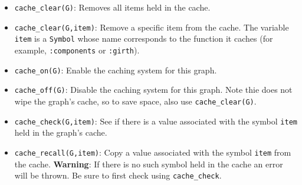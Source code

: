 \documentclass[oneside]{amsart}
\begin{document}
\begin{itemize}
\item \verb|cache_clear(G)|: Removes all items held in the cache.

\item \verb|cache_clear(G,item)|: Remove a specific item from the
  cache. The variable \verb|item| is a \verb|Symbol| whose name
  corresponds to the function it caches (for example,
  \verb|:components| or \verb|:girth|).

\item \verb|cache_on(G)|: Enable the caching system for this graph.

\item \verb|cache_off(G)|: Disable the caching system for this graph.
  Note thie does not wipe the graph's cache, so to save space, also
  use \verb|cache_clear(G)|.

\item \verb|cache_check(G,item)|: See if there is a value associated
  with the symbol \verb|item| held in the graph's cache.

\item \verb|cache_recall(G,item)|: Copy a value associated with the
  symbol \verb|item| from the cache. \textbf{Warning}: If there is
  no such symbol held in the cache an error will be thrown. Be sure
  to first check using \verb|cache_check|.

\end{itemize}
\end{document}
